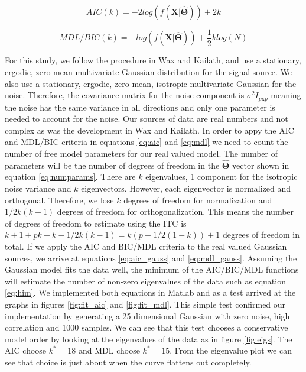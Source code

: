 \documentclass[journal]{IEEEtran}
\begin{document}
\begin{equation}
\label{eq:aic}
AIC(k) = -2 log(f(\bm{X} | \bm{\hat{\Theta}})) + 2k
\end{equation}

\begin{equation}
\label{eq:mdl}
MDL/BIC(k) = -log(f(\bm{X}|\bm{\hat{\Theta}})) + \frac{1}{2}klog(N)
\end{equation}

\par For this study, we follow the procedure in Wax and Kailath, and use a stationary, ergodic, zero-mean multivariate Gaussian distribution for the signal source. We also use a stationary, ergodic, zero-mean, isotropic multivariate Gaussian for the noise. Therefore, the covariance matrix for the noise component is \(\sigma^2I_{p\text{x}p}\) meaning the noise has the same variance in all directions and only one parameter is needed to account for the noise. Our sources of data are real numbers and not complex as was the development in Wax and Kailath. In order to appy the AIC and MDL/BIC criteria in equations \ref{eq:aic} and \ref{eq:mdl} we need to count the number of free model parameters for our real valued model. The number of parameters will be the number of degrees of freedom in the \(\bm{\hat{\Theta}}\) vector shown in equation \ref{eq:numparams}. There are \(k\) eigenvalues, 1 component for the isotropic noise variance and \(k\) eigenvectors. However, each eigenvector is normalized and orthogonal. Therefore, we lose \(k\) degrees of freedom for normalization and \(1/2k(k-1)\) degrees of freedom for orthogonalization. This means the number of degrees of freedom to estimate using the ITC is \(k + 1 + pk -k -1/2k(k-1) = k(p+1/2(1-k))+1\) degrees of freedom in total. If we apply the AIC and BIC/MDL criteria to the real valued Gaussian sources, we arrive at equations \ref{eq:aic_gauss} and \ref{eq:mdl_gauss}. Assuming the Gaussian model fits the data well, the minimum of the AIC/BIC/MDL functions will estimate the number of non-zero eigenvalues of the data such as equation \ref{eq:him}. We implemented both equations in Matlab and as a test arrived at the graphs in figures \ref{fig:fit_aic} and \ref{fig:fit_mdl}. This simple test confirmed our implementation by generating a 25 dimensional Gaussian with zero noise, high correlation and 1000 samples. We can see that this test chooses a conservative model order by looking at the eigenvalues of the data as in figure \ref{fig:eigs}. The AIC choose \(k^* = 18\) and MDL choose \(k^* = 15\). From the eigenvalue plot we can see that choice is just about when the curve flattens out completely.
\end{document}
